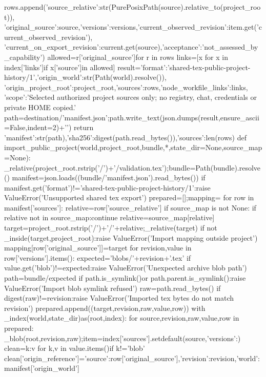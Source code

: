             rows.append({'source_relative':str(PurePosixPath(source).relative_to(project_root)),
                         'original_source':source,'versions':versions,'current_observed_revision':item.get('current_observed_revision'),
                         'current_on_export_revision':current.get(source),'acceptance':'not_assessed_by_capability'})
    allowed={r['original_source']for r in rows}
    links=[x for x in index['links']if x['source']in allowed]
    result={'format':'shared-tex-public-project-history/1','origin_world':str(Path(world).resolve()),
            'origin_project_root':project_root,'sources':rows,'node_workfile_links':links,
            'scope':'Selected authorized project sources only; no registry, chat, credentials or private HOME copied.'}
    path=destination/'manifest.json';path.write_text(json.dumps(result,ensure_ascii=False,indent=2)+'\n')
    return {'manifest':str(path),'sha256':digest(path.read_bytes()),'sources':len(rows)}
def import_public_project(world,project_root,bundle,*,state_dir=None,source_map=None):
    _relative(project_root.rstrip('/')+'/validation.tex');bundle=Path(bundle).resolve()
    manifest=json.loads((bundle/'manifest.json').read_bytes())
    if manifest.get('format')!='shared-tex-public-project-history/1':raise ValueError('Unsupported shared tex export')
    prepared=[];mapping={}
    for row in manifest['sources']:
        relative=row['source_relative']
        if source_map is not None:
            if relative not in source_map:continue
            relative=source_map[relative]
        target=project_root.rstrip('/')+'/'+relative;_relative(target)
        if not _inside(target,project_root):raise ValueError('Import mapping outside project')
        mapping[row['original_source']]=target
        for revision,value in row['versions'].items():
            expected='blobs/'+revision+'.tex'
            if value.get('blob')!=expected:raise ValueError('Unexpected archive blob path')
            path=bundle/expected
            if path.is_symlink()or path.parent.is_symlink():raise ValueError('Import blob symlink refused')
            raw=path.read_bytes()
            if digest(raw)!=revision:raise ValueError('Imported tex bytes do not match revision')
            prepared.append((target,revision,raw,value,row))
    with _index(world,state_dir)as(root,index):
        for source,revision,raw,value,row in prepared:
            _blob(root,revision,raw);item=index['sources'].setdefault(source,{'versions':{}})
            clean={k:v for k,v in value.items()if k!='blob'}
            clean['origin_reference']={'source':row['original_source'],'revision':revision,'world':manifest['origin_world']}
